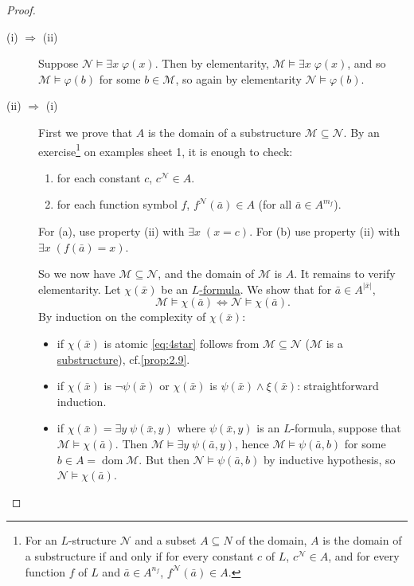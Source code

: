 \documentclass{article}
\let\models\vDash
\DeclareMathOperator{\dom}{dom}
\begin{document}
\begin{proof}\leavevmode
  \begin{description}
    \item [(i) $\Rightarrow$ (ii)] Suppose $\mathcal{N} \models \exists x \; \varphi(x)$.
      Then by elementarity, $\mathcal{M} \models \exists x \; \varphi(x)$, and so $\mathcal{M} \models \varphi(b)$ for some $b \in \mathcal{M}$, so again by elementarity $\mathcal{N} \models \varphi(b)$.
    \item [(ii) $\Rightarrow$ (i)] First we prove that $A$ is the domain of a substructure $\mathcal{M} \subseteq \mathcal{N}$.
      By an exercise\footnote{For an $L$-structure $\mathcal{N}$ and a subset $A \subseteq N$ of the domain, $A$ is the domain of a substructure if and only if for every constant $c$ of $L$, $c^\mathcal{N} \in A$, and for every function $f$ of $L$ and $\bar a \in A^{n_f}$, $f^\mathcal{N}(\bar a) \in A$.} on examples sheet 1, it is enough to check:
      \begin{enumerate}[label=(\alph*)]
        \item for each constant $c$, $c^\mathcal{N} \in A$.
        \item for each function symbol $f$, $f^{\mathcal{N}}(\bar{a}) \in A$ (for all $\bar{a} \in A^{m_f}$).
      \end{enumerate}
      For (a), use property (ii) with $\exists x\; (x = c)$. For (b) use property (ii) with $\exists x\; (f(\bar{a}) = x)$.

      So we now have $\mathcal{M} \subseteq \mathcal{N}$, and the domain of $\mathcal{M}$ is $A$.
      It remains to verify elementarity.
      Let $\chi(\bar{x})$ be an \hyperlink{def:form}{$L$-formula}.
      We show that for $\bar{a} \in A^{|\bar{x}|}$,
      \begin{equation*}
        \mathcal{M} \models \chi(\bar{a}) \iff \mathcal{N} \models \chi(\bar{a}). \tag{$*$} \label{eq:4star}
      \end{equation*}
      By induction on the complexity of $\chi(\bar{x})$:
      \begin{itemize}[label=--]
        \item if $\chi(\bar{x})$ is atomic \eqref{eq:4star} follows from $\mathcal{M} \subseteq \mathcal{N}$ ($\mathcal{M}$ is a \hyperlink{def:subs}{substructure}), cf.\@ \cref{prop:2.9}.
        \item if $\chi(\bar{x})$ is $\neg \psi(\bar{x})$ or $\chi(\bar{x})$ is $\psi(\bar{x}) \wedge \xi(\bar{x})$: straightforward induction.
        \item if $\chi(\bar{x}) = \exists y \; \psi(\bar{x},y)$ where $\psi(\bar{x},y)$ is an $L$-formula, suppose that $\mathcal{M} \models \chi(\bar{a})$.
          Then $\mathcal{M} \models \exists y \; \psi(\bar{a}, y)$, hence $\mathcal{M} \models \psi(\bar{a},b)$ for some $b \in A = \dom \mathcal{M}$.
          But then $\mathcal{N} \models \psi(\bar{a},b)$ by inductive hypothesis, so $\mathcal{N} \models \chi(\bar{a})$.


\end{itemize}
\end{description}
\end{proof}
\end{document}
